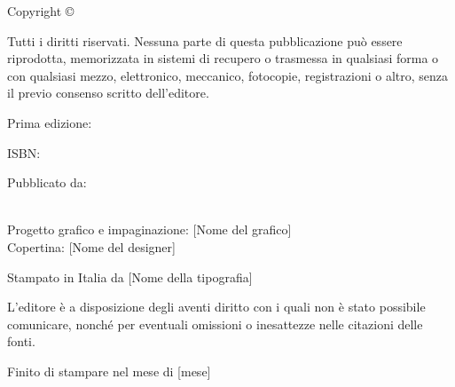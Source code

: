 
\thispagestyle{empty}

\vspace*{\fill}

\noindent
Copyright \copyright\ \editionyear\ \authorname

\vspace{0.5em}

\noindent
Tutti i diritti riservati. Nessuna parte di questa pubblicazione può essere riprodotta, 
memorizzata in sistemi di recupero o trasmessa in qualsiasi forma o con qualsiasi mezzo, 
elettronico, meccanico, fotocopie, registrazioni o altro, senza il previo consenso 
scritto dell'editore.

\vspace{1em}

\noindent
Prima edizione: \editionyear

\vspace{1em}

\noindent
ISBN: \isbn

\vspace{1em}

\noindent
Pubblicato da:\\
\publisher\\

\vspace{1em}

\noindent
Progetto grafico e impaginazione: [Nome del grafico]\\
Copertina: [Nome del designer]

\vspace{1em}

\noindent
Stampato in Italia da [Nome della tipografia]

\vspace{1em}

\noindent
\small
L'editore è a disposizione degli aventi diritto con i quali non è stato possibile 
comunicare, nonché per eventuali omissioni o inesattezze nelle citazioni delle fonti.

\vspace{1em}

\noindent
\small
Finito di stampare nel mese di [mese] \editionyear